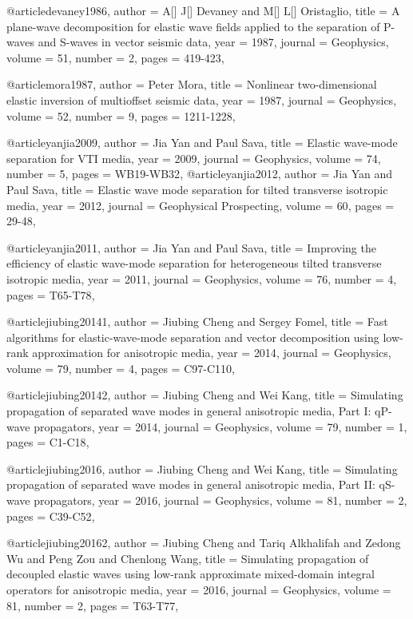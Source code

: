 {@article{devaney1986,
author = {A[] J[] Devaney and M[] L[] Oristaglio},
title = {A plane-wave decomposition for elastic wave fields applied to the separation of P-waves and S-waves in vector seismic data},
year = {1987},
journal = {Geophysics},
volume = {51},
number = {2},
pages = {419-423},
}

@article{mora1987,
author = {Peter Mora},
title = {Nonlinear two-dimensional elastic inversion of multioffset seismic data},
year = {1987},
journal = {Geophysics},
volume = {52},
number = {9},
pages = {1211-1228},
}

@article{yanjia2009,
author = {Jia Yan and Paul Sava},
title = {Elastic wave-mode separation for VTI media},
year = {2009},
journal = {Geophysics},
volume = {74},
number = {5},
pages = {WB19-WB32},
}
@article{yanjia2012,
author = {Jia Yan and Paul Sava},
title = {Elastic wave mode separation for tilted transverse isotropic media},
year = {2012},
journal = {Geophysical Prospecting},
volume = {60},
pages = {29-48},
}

@article{yanjia2011,
author = {Jia Yan and Paul Sava},
title = {Improving the efficiency of elastic wave-mode separation for heterogeneous tilted transverse isotropic media},
year = {2011},
journal = {Geophysics},
volume = {76},
number = {4},
pages = {T65-T78},
}

@article{jiubing20141,
author = {Jiubing Cheng and Sergey Fomel},
title = {Fast algorithms for elastic-wave-mode separation and vector decomposition using low-rank approximation for anisotropic media},
year = {2014},
journal = {Geophysics},
volume = {79},
number = {4},
pages = {C97-C110},
}

@article{jiubing20142,
author = {Jiubing Cheng and Wei Kang},
title = {Simulating propagation of separated wave modes in general anisotropic media, Part I: qP-wave propagators},
year = {2014},
journal = {Geophysics},
volume = {79},
number = {1},
pages = {C1-C18},
}

@article{jiubing2016,
author = {Jiubing Cheng and Wei Kang},
title = {Simulating propagation of separated wave modes in general anisotropic media, Part II: qS-wave propagators},
year = {2016},
journal = {Geophysics},
volume = {81},
number = {2},
pages = {C39-C52},
}

@article{jiubing20162,
author = {Jiubing Cheng and Tariq Alkhalifah and Zedong Wu and Peng Zou and Chenlong Wang},
title = {Simulating propagation of decoupled elastic waves using low-rank approximate mixed-domain integral operators for anisotropic media},
year = {2016},
journal = {Geophysics},
volume = {81},
number = {2},
pages = {T63-T77},
}

}

